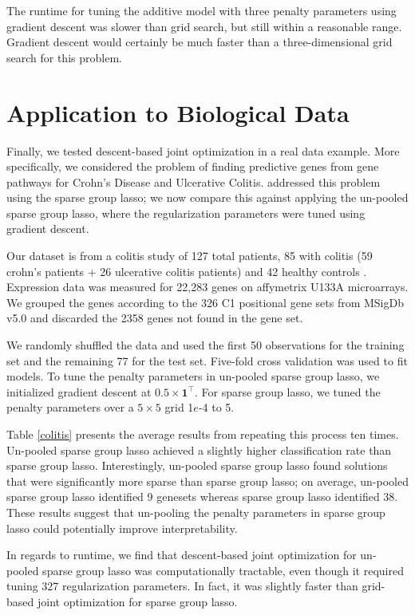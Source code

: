 \documentclass{statsoc}
\begin{document}
The runtime for tuning the additive model with three penalty parameters using gradient descent was slower than grid search, but still within a reasonable range. Gradient descent would certainly be much faster than a three-dimensional grid search for this problem.

\section{Application to Biological Data}\label{realDataResults}
Finally, we tested descent-based joint optimization in a real data example. More specifically, we considered the problem of finding predictive genes from gene pathways for Crohn's Disease and Ulcerative Colitis. \citet{simon2013sparse} addressed this problem using the sparse group lasso; we now compare this against applying the un-pooled sparse group lasso, where the regularization parameters were tuned using gradient descent.

Our dataset is from a colitis study of 127 total patients, 85 with colitis (59 crohn's patients + 26 ulcerative colitis patients) and 42 healthy controls \citep{burczynski2006molecular}. Expression data was measured for 22,283 genes on affymetrix U133A microarrays. We grouped the genes according to the 326 C1 positional gene sets from MSigDb v5.0 \citep{subramanian2005gene} and discarded the 2358 genes not found in the gene set.

We randomly shuffled the data and used the first 50 observations for the training set and the remaining 77 for the test set. Five-fold cross validation was used to fit models. To tune the penalty parameters in un-pooled sparse group lasso, we initialized gradient descent at $0.5 \times \boldsymbol 1^\top$. For sparse group lasso, we tuned the penalty parameters over a $5 \times 5$ grid 1$e$-4 to 5.

Table \ref{colitis} presents the average results from repeating this process ten times. Un-pooled sparse group lasso achieved a slightly higher classification rate than sparse group lasso. Interestingly, un-pooled sparse group lasso found solutions that were significantly more sparse than sparse group lasso; on average, un-pooled sparse group lasso identified 9 genesets whereas sparse group lasso identified 38. These results suggest that un-pooling the penalty parameters in sparse group lasso could potentially improve interpretability.

In regards to runtime, we find that descent-based joint optimization for un-pooled sparse group lasso was computationally tractable, even though it required tuning 327 regularization parameters. In fact, it was slightly faster than grid-based joint optimization for sparse group lasso.
\end{document}
